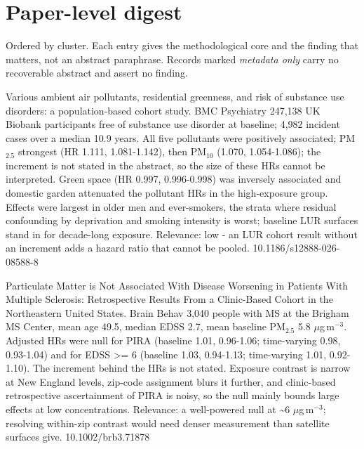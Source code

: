 \documentclass[10pt]{article}
\begin{document}
\vspace{4mm}

\par{}\baselineskip{}\baselineskip
\section*{\sffamily\bfseries\color{Deep}Paper-level digest}
\vspace{-1.5mm}{\color{Amber}\rule{\linewidth}{1.1pt}}\vspace{2.5mm}

{\fontsize{7.4}{9}\selectfont\color{Slate}Ordered by cluster. Each entry gives the
methodological core and the finding that matters, not an abstract paraphrase. Records
marked \textit{metadata only} carry no recoverable abstract and assert no finding.\par}


{Various ambient air pollutants, residential greenness, and risk of substance use disorders: a population-based cohort study.}
{BMC Psychiatry}
{247,138 UK Biobank participants free of substance use disorder at baseline; 4,982 incident cases over a median 10.9 years. All five pollutants were positively associated; PM$_{2.5}$ strongest (HR 1.111, 1.081-1.142), then PM$_{10}$ (1.070, 1.054-1.086); the increment is not stated in the abstract, so the size of these HRs cannot be interpreted. Green space (HR 0.997, 0.996-0.998) was inversely associated and domestic garden attenuated the pollutant HRs in the high-exposure group. Effects were largest in older men and ever-smokers, the strata where residual confounding by deprivation and smoking intensity is worst; baseline LUR surfaces stand in for decade-long exposure. Relevance: low - an LUR cohort result without an increment adds a hazard ratio that cannot be pooled.}
{10.1186/s12888-026-08588-8}

{Particulate Matter is Not Associated With Disease Worsening in Patients With Multiple Sclerosis: Retrospective Results From a Clinic-Based Cohort in the Northeastern United States.}
{Brain Behav}
{3,040 people with MS at the Brigham MS Center, mean age 49.5, median EDSS 2.7, mean baseline PM$_{2.5}$ 5.8 $\mu$g\,m$^{-3}$. Adjusted HRs were null for PIRA (baseline 1.01, 0.96-1.06; time-varying 0.98, 0.93-1.04) and for EDSS >= 6 (baseline 1.03, 0.94-1.13; time-varying 1.01, 0.92-1.10). The increment behind the HRs is not stated. Exposure contrast is narrow at New England levels, zip-code assignment blurs it further, and clinic-based retrospective ascertainment of PIRA is noisy, so the null mainly bounds large effects at low concentrations. Relevance: a well-powered null at \textasciitilde{}6 $\mu$g\,m$^{-3}$; resolving within-zip contrast would need denser measurement than satellite surfaces give.}
{10.1002/brb3.71878}
\end{document}
